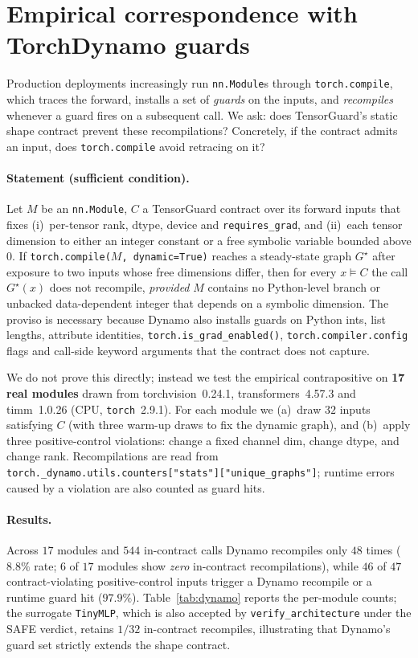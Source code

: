 \section{Empirical correspondence with TorchDynamo guards}
\label{sec:dynamo}

Production deployments increasingly run \texttt{nn.Module}s through
\texttt{torch.compile}, which traces the forward, installs a set of
\emph{guards} on the inputs, and \emph{recompiles} whenever a guard fires
on a subsequent call.  We ask: does TensorGuard's static shape contract
prevent these recompilations?  Concretely, if the contract admits an
input, does \texttt{torch.compile} avoid retracing on it?

\paragraph{Statement (sufficient condition).}
Let $M$ be an \texttt{nn.Module}, $C$ a TensorGuard contract over its
forward inputs that fixes (i)~per-tensor rank, dtype, device and
\texttt{requires\_grad}, and (ii)~each tensor dimension to either an integer
constant or a free symbolic variable bounded above $0$.  If
\texttt{torch.compile($M$, dynamic=True)} reaches a steady-state graph
$G^\star$ after exposure to two inputs whose free dimensions differ, then
for every $x\models C$ the call $G^\star(x)$ does not recompile,
\emph{provided} $M$ contains no Python-level branch or unbacked
data-dependent integer that depends on a symbolic dimension.  The proviso
is necessary because Dynamo also installs guards on Python ints, list
lengths, attribute identities, \texttt{torch.is\_grad\_enabled()},
\texttt{torch.compiler.config} flags and call-side keyword arguments that
the contract does not capture.

We do not prove this directly; instead we test the empirical contrapositive
on \textbf{17 real modules} drawn from torchvision~0.24.1, transformers~4.57.3
and timm~1.0.26 (CPU, \texttt{torch}~2.9.1).  For each module we (a)~draw
$32$ inputs satisfying $C$ (with three warm-up draws to fix the dynamic
graph), and (b)~apply three positive-control violations: change a fixed
channel dim, change dtype, and change rank.  Recompilations are read from
\texttt{torch.\_dynamo.utils.counters["stats"]["unique\_graphs"]}; runtime
errors caused by a violation are also counted as guard hits.

\paragraph{Results.}
Across $17$ modules and $544$ in-contract calls Dynamo recompiles only
$48$ times ($8.8\%$ rate; $6$ of $17$ modules show \emph{zero} in-contract
recompilations), while $46$ of $47$ contract-violating positive-control
inputs trigger a Dynamo recompile or a runtime guard hit ($97.9\%$).
Table~\ref{tab:dynamo} reports the per-module counts; the surrogate
\texttt{TinyMLP}, which is also accepted by \texttt{verify\_architecture}
under the SAFE verdict, retains $1/32$ in-contract recompiles, illustrating
that Dynamo's guard set strictly extends the shape contract.

